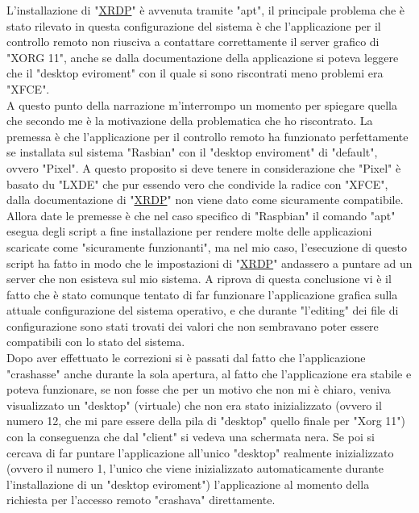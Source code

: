 L'installazione di "\href{https://github.com/neutrinolabs/xrdp}{XRDP}" è avvenuta tramite "apt", il principale problema che è stato rilevato in questa configurazione del sistema è che l'applicazione per il controllo remoto non riusciva a contattare correttamente il server grafico di "XORG 11", anche se dalla documentazione della applicazione si poteva leggere che il "desktop eviroment" con il quale si sono riscontrati meno problemi era "XFCE".\\
A questo punto della narrazione m'interrompo un momento per spiegare quella che secondo me è la motivazione della problematica che ho riscontrato. La premessa è che l'applicazione per il controllo remoto ha funzionato perfettamente se installata sul sistema "Rasbian" con il "desktop enviroment" di "default", ovvero "Pixel". A questo proposito si deve tenere in considerazione che "Pixel" è basato du "LXDE" che pur essendo vero che condivide la radice con "XFCE", dalla documentazione di "\href{https://github.com/neutrinolabs/xrdp}{XRDP}" non viene dato come sicuramente compatibile. Allora date le premesse è che nel caso specifico di "Raspbian" il comando "apt" esegua degli script a fine installazione per rendere molte delle applicazioni scaricate come "sicuramente funzionanti", ma nel mio caso, l'esecuzione di questo script ha fatto in modo che le impostazioni di "\href{https://github.com/neutrinolabs/xrdp}{XRDP}" andassero a puntare ad un server che non esisteva sul mio sistema. A riprova di questa conclusione vi è il fatto che è stato comunque tentato di far funzionare l'applicazione grafica sulla attuale configurazione del sistema operativo, e che durante "l'editing" dei file di configurazione sono stati trovati dei valori che non sembravano poter essere compatibili con lo stato del sistema.\\
Dopo aver effettuato le correzioni si è passati dal fatto che l'applicazione "crashasse" anche durante la sola apertura, al fatto che l'applicazione era stabile e poteva funzionare, se non fosse che per un motivo che non mi è chiaro, veniva visualizzato un "desktop" (virtuale) che non era stato inizializzato (ovvero il numero 12, che mi pare essere della pila di "desktop" quello finale per "Xorg 11") con la conseguenza che dal "client" si vedeva una schermata nera. Se poi si cercava di far puntare l'applicazione all'unico "desktop" realmente inizializzato  (ovvero il numero 1, l'unico che viene inizializzato automaticamente durante l'installazione di un "desktop eviroment") l'applicazione al momento della richiesta per l'accesso remoto "crashava" direttamente.\\

